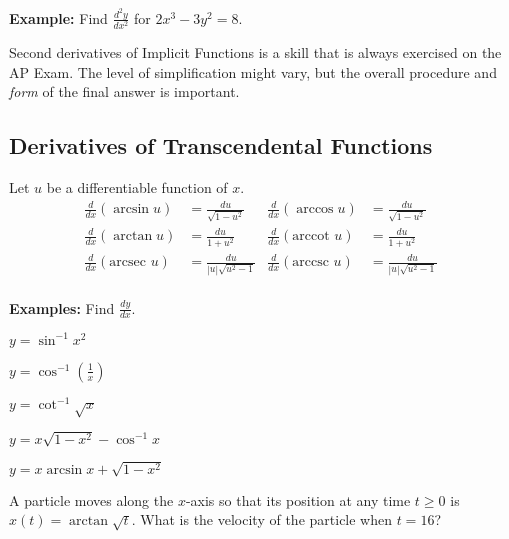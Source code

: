 \documentclass[addpoints, 12pt]{exam}
\begin{document}
\textbf{Example:} Find $\displaystyle\frac{d^2y}{dx^2}$ for $2x^3-3y^2=8$.

Second derivatives of Implicit Functions is a skill that is always exercised on the AP Exam. The level of simplification might vary, but the overall procedure and \textit{form} of the final answer is important.



\newpage
{}
\subsection*{Derivatives of Transcendental Functions}
\begin{tcolorbox}[title= DERIVATIVES OF INVERSE TRIGONOMETRIC FUNCTIONS,black,sharp corners, colback=white, colbacktitle=white, coltitle=black, boxrule=1pt]
    
    Let $u$ be a differentiable function of $x$.
    \begin{align*}
        \frac{d}{dx}(\arcsin u) &= \frac{du}{\sqrt{1-u^2}} & \frac{d}{dx}(\arccos u) &= \frac{du}{\sqrt{1-u^2}}\\
        \frac{d}{dx}(\arctan u) &= \frac{du}{1+u^2} & \frac{d}{dx}(\text{arccot } u) &= \frac{du}{1+u^2}\\
        \frac{d}{dx}(\text{arcsec } u) &= \frac{du}{|u|\sqrt{u^2-1}} & \frac{d}{dx}(\text{arccsc } u) &= \frac{du}{|u|\sqrt{u^2-1}}\\
    \end{align*}
\end{tcolorbox}
\vspace{.15cm}
\noindent\textbf{Examples:} Find $\displaystyle\frac{dy}{dx}$.
\begin{questions}
    \question $\displaystyle y=\sin^{-1}x^2$
    
    \question $\displaystyle y=\cos^{-1}\left(\frac{1}{x}\right)$
    
    \question $\displaystyle y=\cot^{-1}\sqrt{x}$
    
    \question $\displaystyle y=x\sqrt{1-x^2}-\cos^{-1}x$
    
    \newpage
    
    \question $\displaystyle y=x\arcsin x+\sqrt{1-x^2}$
    
    \question A particle moves along the $x$-axis so that its position at any time $t\ge0$ is $x(t)=\arctan\sqrt{t}$. What is the velocity of the particle when $t=16$?
\end{questions}
\end{document}
